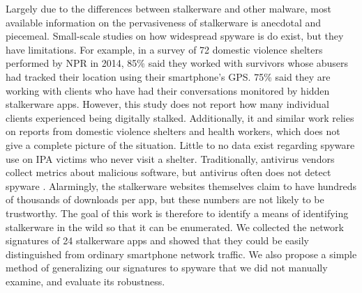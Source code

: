 \documentclass[acmtog]{acmart}
\begin{document}
Largely due to the differences between stalkerware and other malware, most 
available information on the pervasiveness of stalkerware is anecdotal and 
piecemeal. Small-scale studies on how widespread spyware is do exist, but they 
have limitations. For example, in a survey of 72 
domestic violence shelters performed by NPR in 2014, 85\% said they worked with 
survivors whose abusers had tracked their location using their smartphone's 
GPS. 75\% said they are working with clients who have had their conversations 
monitored by hidden stalkerware apps.\cite{shahani_smartphones_nodate} However, 
this study does not report how many individual clients experienced being 
digitally stalked. Additionally, it and similar work relies on 
reports from domestic violence shelters and health workers, which does not give 
a complete picture of the situation. Little to no data exist regarding spyware 
use on IPA victims who never visit a shelter. Traditionally, antivirus vendors 
collect metrics about 
malicious software, but antivirus often does not detect spyware 
\cite{chatterjee_spyware_2018}. Alarmingly, the stalkerware 
websites themselves claim to have hundreds of thousands of downloads per app, 
but these numbers are not likely to be trustworthy. The goal of this work is 
therefore to identify a means of identifying stalkerware in the wild so that it 
can be enumerated. We collected the network signatures of 24 stalkerware apps 
and showed that they could be easily distinguished from ordinary smartphone 
network traffic. We also propose a simple method of generalizing our signatures 
to spyware that we did not manually examine, and evaluate its robustness.
\end{document}
